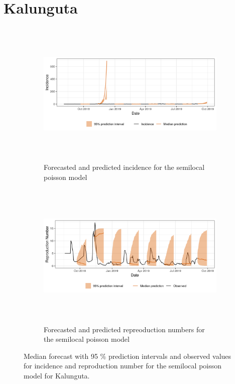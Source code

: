  \section{ Kalunguta }\begin{figure}[H]\begin{subfigure}{\textwidth}  \centering  \includegraphics[width=0.9\linewidth, height=7cm]{../output/Kalunguta_predictions.png}  \caption{Forecasted and predicted incidence for the semilocal poisson model}\end{subfigure}

\begin{subfigure}{\textwidth}  \centering  \includegraphics[width=0.9\linewidth, height=7cm]{../output/Kalunguta_Rs.png}  \caption{Forecasted and predicted repreoduction numbers for the semilocal poisson model}\end{subfigure}  \caption{Median forecast with 95 \% prediction intervals and observed values for incidence and reproduction number for the semilocal poisson model for Kalunguta.}\end{figure}

